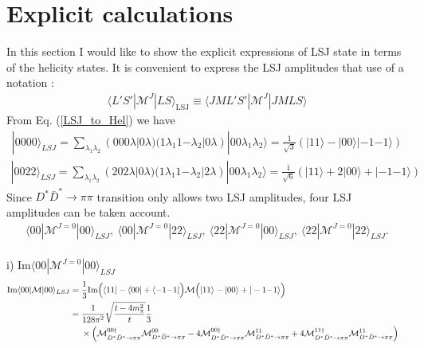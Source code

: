 \documentclass[aps,prd,preprintnumbers,showpacs,showkeys,nofootinbib,
superscriptaddress,fleqn,floatfix,tightenlines, 10pt]{revtex4-1}
\begin{document}
\section{Explicit calculations}
In this section I would like to show the explicit expressions of
LSJ state in terms of the helicity states. It is convenient to
express the LSJ amplitudes that use of a notation :
\begin{align} \label{LSJ_DDpipi}
	\langle L'S' | \mathcal{M}^J | LS \rangle_{\mathrm{LSJ}} \equiv \langle JML'S' | \mathcal{M}^J | JMLS \rangle
\end{align}
From Eq. (\ref{LSJ_to_Hel}) we have
\begin{align} \label{0000LSJ}
	|0000 \rangle_{LSJ} = \sum_{\lambda_1 \lambda_2}
	(000\lambda|0\lambda)(1\lambda_1 1{-\lambda_2}|0\lambda)
	|00\lambda_1 \lambda_2 \rangle
	= \frac{1}{\sqrt{3}}\left(|11\rangle - |00\rangle |-1{-1}\rangle \right)
\end{align}
\begin{align} \label{0022LSJ}
	|0022 \rangle_{LSJ} = \sum_{\lambda_1 \lambda_2}
	(202\lambda|0\lambda)(1\lambda_1 1{-\lambda_2}|2\lambda)
	|00\lambda_1 \lambda_2 \rangle
	=\frac{1}{\sqrt{6}} \left(|11\rangle + 2|00\rangle + |-1{-1}\rangle \right)
\end{align}
Since $D^* \bar{D}^* \rightarrow \pi\pi$ transition only allows
two LSJ amplitudes, four LSJ amplitudes can be taken account.
\begin{align} \label{LSJs}
	\langle 00 | \mathcal{M}^{J=0} | 00 \rangle_{LSJ}, \
	\langle 00 | \mathcal{M}^{J=0} | 22 \rangle_{LSJ}, \
	\langle 22 | \mathcal{M}^{J=0} | 00 \rangle_{LSJ}, \
	\langle 22 | \mathcal{M}^{J=0} | 22 \rangle_{LSJ}.
\end{align}\\
i) Im$\langle00|\mathcal{M}^{J=0}|00\rangle_{LSJ}$
\begin{align} \label{Im0000}
	\mathrm{Im} \langle 00|\mathcal{M}|00\rangle_{LSJ}
	&= \frac{1}{3} \mathrm{Im}
	\Big(\langle 11| - \langle 00| + \langle -1{-1}|\Big) \mathcal{M}
	\Big(|11\rangle - |00\rangle + |-1{-1}\rangle\Big) \cr
	&= \frac{1}{128\pi^2} \sqrt{\frac{t-4m_\pi^2}{t}}
	\frac{1}{3} \cr
	&\quad\ \times \left(
	\mathcal{M}^{00 \dagger}_{D^* \bar{D}^* \rightarrow \pi\pi}
	\mathcal{M}^{00}_{D^* \bar{D}^* \rightarrow \pi\pi}
	- 4 \mathcal{M}^{00 \dagger}_{D^* \bar{D}^* \rightarrow \pi\pi}
	\mathcal{M}^{11}_{D^* \bar{D}^* \rightarrow \pi\pi}
	+ 4 \mathcal{M}^{11 \dagger}_{D^* \bar{D}^* \rightarrow \pi\pi}
	 \mathcal{M}^{11}_{D^* \bar{D}^* \rightarrow \pi\pi}
	\right)
\end{align}\\
\end{document}
